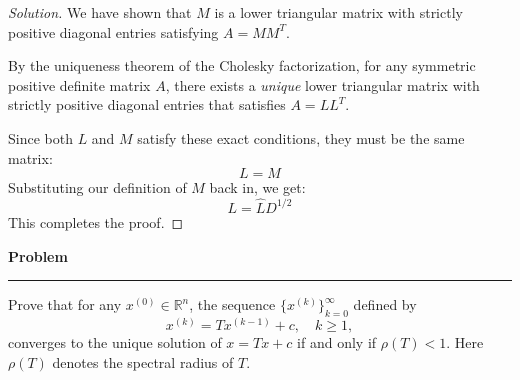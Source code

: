 \documentclass[11pt, a4paper]{article}
\newenvironment{problem}{%
  \begin{tcolorbox}[
    colback=blue!4!white,
    colframe=blue!38!black,
    boxrule=0.95pt,
    arc=3pt,
    left=11pt,
    right=11pt,
    top=10pt,
    bottom=11pt,
    before skip=12pt,
    after skip=14pt,
  ]
  \noindent\textbf{\textcolor{blue!35!black}{Problem}}\par\nointerlineskip
  {\color{blue!42!black}\rule{\linewidth}{0.55pt}}\par\vspace{0.55em}%
}{%
  \end{tcolorbox}%
}
\newif\ifsolutionnewpage
\newenvironment{solution}
  {\begin{proof}[Solution]}
  {\end{proof}\ifsolutionnewpage\newpage\fi}
\begin{document}
\begin{solution}
    We have shown that $M$ is a lower triangular matrix with strictly positive diagonal entries satisfying $A = MM^T$. 

    By the uniqueness theorem of the Cholesky factorization, for any symmetric positive definite matrix $A$, there exists a \emph{unique} lower triangular matrix with strictly positive diagonal entries that satisfies $A = LL^T$. 
    
    Since both $L$ and $M$ satisfy these exact conditions, they must be the same matrix:
    \[
    L = M
    \]
    Substituting our definition of $M$ back in, we get:
    \[
    L = \hat{L}D^{1/2}
    \]
    This completes the proof.
\end{solution}



\begin{problem}
    Prove that for any $x^{(0)}\in\mathbb{R}^{n}$, the sequence $\{x^{(k)}\}_{k=0}^{\infty}$ defined by
    \[
    x^{(k)}=Tx^{(k-1)}+c, \quad k\ge1,
    \]
    converges to the unique solution of $x=Tx+c$ if and only if $\rho(T)<1$. Here $\rho(T)$ denotes the spectral radius of $T$.
\end{problem}
\end{document}
